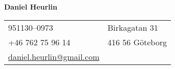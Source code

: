 \documentclass[letterpaper,11pt,oneside]{article}
\begin{document}

\noindent  \LARGE{\textbf{Daniel Heurlin}}  \\
\vspace{-2ex}
\toprule
\normalsize


\begin{center}
\begin{tabular}{l l}
 951130–0973      & \hspace{1in}  Birkagatan 31 \\ 
 +46 762 75 96 14 & \hspace{1in}  416 56 Göteborg \\ 
 \href{mailto:daniel.heurlin@gmail.com}{daniel.heurlin@gmail.com} &
\end{tabular}
\end{center}

\vspace{1em}

\end{document}
